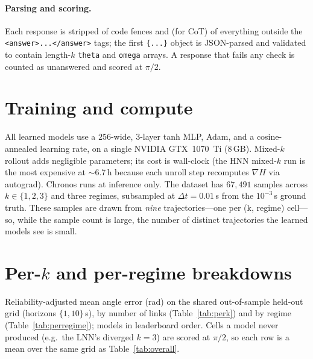 \documentclass{article}
\begin{document}
\paragraph{Parsing and scoring.} Each response is stripped of code fences and (for CoT) of
everything outside the \texttt{<answer>...</answer>} tags; the first \texttt{\{...\}} object
is JSON-parsed and validated to contain length-$k$ \texttt{theta} and \texttt{omega} arrays.
A response that fails any check is counted as unanswered and scored at $\pi/2$.

\section{Training and compute}
All learned models use a $256$-wide, $3$-layer tanh MLP, Adam, and a cosine-annealed learning
rate, on a single NVIDIA GTX~1070~Ti (8\,GB). Mixed-$k$ rollout adds negligible parameters;
its cost is wall-clock (the HNN mixed-$k$ run is the most expensive at $\sim$6.7\,h because
each unroll step recomputes $\nabla H$ via autograd). Chronos runs at inference only. The
dataset has $67{,}491$ samples across $k\in\{1,2,3\}$ and three regimes, subsampled at
$\Delta t{=}0.01$\,s from the $10^{-3}$\,s ground truth. These samples are drawn from
\emph{nine} trajectories---one per (k, regime) cell---so, while the sample count is large, the
number of distinct trajectories the learned models see is small.

\section{Per-$k$ and per-regime breakdowns}
\label{app:breakdown}
Reliability-adjusted mean angle error (rad) on the shared out-of-sample held-out grid
(horizons $\{1,10\}$\,s), by number of links (Table~\ref{tab:perk}) and by regime
(Table~\ref{tab:perregime}); models in leaderboard order. Cells a model never produced (e.g.\
the LNN's diverged $k{=}3$) are scored at $\pi/2$, so each row is a mean over the same grid as
Table~\ref{tab:overall}.
\end{document}
